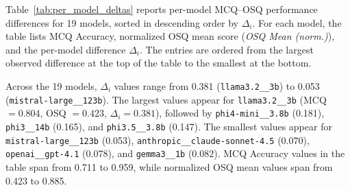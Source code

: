 Table~\ref{tab:per_model_deltas} reports per-model MCQ--OSQ performance differences for 19 models, sorted in descending order by \(\Delta_i\). For each model, the table lists MCQ Accuracy, normalized OSQ mean score (\textit{OSQ Mean (norm.)}), and the per-model difference \(\Delta_i\). The entries are ordered from the largest observed difference at the top of the table to the smallest at the bottom.

Across the 19 models, \(\Delta_i\) values range from 0.381 (\texttt{llama3.2\_\_3b}) to 0.053 (\texttt{mistral-large\_\_123b}). The largest values appear for \texttt{llama3.2\_\_3b} (MCQ \(=0.804\), OSQ \(=0.423\), \(\Delta_i=0.381\)), followed by \texttt{phi4-mini\_\_3.8b} (0.181), \texttt{phi3\_\_14b} (0.165), and \texttt{phi3.5\_\_3.8b} (0.147). The smallest values appear for \texttt{mistral-large\_\_123b} (0.053), \texttt{anthropic\_\_claude-sonnet-4.5} (0.070), \texttt{openai\_\_gpt-4.1} (0.078), and \texttt{gemma3\_\_1b} (0.082). MCQ Accuracy values in the table span from 0.711 to 0.959, while normalized OSQ mean values span from 0.423 to 0.885.


